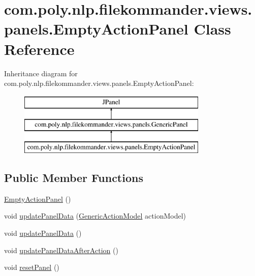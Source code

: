\hypertarget{classcom_1_1poly_1_1nlp_1_1filekommander_1_1views_1_1panels_1_1_empty_action_panel}{\section{com.\-poly.\-nlp.\-filekommander.\-views.\-panels.\-Empty\-Action\-Panel Class Reference}
\label{classcom_1_1poly_1_1nlp_1_1filekommander_1_1views_1_1panels_1_1_empty_action_panel}
}
Inheritance diagram for com.\-poly.\-nlp.\-filekommander.\-views.\-panels.\-Empty\-Action\-Panel\-:\begin{figure}[H]
\begin{center}
\leavevmode
\includegraphics[height=3.000000cm]{classcom_1_1poly_1_1nlp_1_1filekommander_1_1views_1_1panels_1_1_empty_action_panel}
\end{center}
\end{figure}
\subsection*{Public Member Functions}
\begin{DoxyCompactItemize}
\item 
\hyperlink{classcom_1_1poly_1_1nlp_1_1filekommander_1_1views_1_1panels_1_1_empty_action_panel_a2d7a56c5418f0e7077ead91183425dd7}{Empty\-Action\-Panel} ()
\item 
void \hyperlink{classcom_1_1poly_1_1nlp_1_1filekommander_1_1views_1_1panels_1_1_empty_action_panel_a02f8291cb8e79ed8d522baceb3126d61}{update\-Panel\-Data} (\hyperlink{interfacecom_1_1poly_1_1nlp_1_1filekommander_1_1views_1_1models_1_1_generic_action_model}{Generic\-Action\-Model} action\-Model)
\item 
void \hyperlink{classcom_1_1poly_1_1nlp_1_1filekommander_1_1views_1_1panels_1_1_empty_action_panel_a7cc048c6d5cad377fd871cec0747a6b8}{update\-Panel\-Data} ()
\item 
void \hyperlink{classcom_1_1poly_1_1nlp_1_1filekommander_1_1views_1_1panels_1_1_empty_action_panel_a3e1704fd567bd8b67851f6068035aad3}{update\-Panel\-Data\-After\-Action} ()
\item 
void \hyperlink{classcom_1_1poly_1_1nlp_1_1filekommander_1_1views_1_1panels_1_1_empty_action_panel_a24d911a685434b89e383275ffeca0f69}{reset\-Panel} ()
\end{DoxyCompactItemize}
